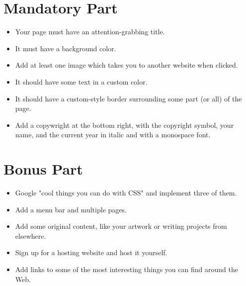 \documentclass{42-en}
\begin{document}

\chapter{Mandatory Part}

\begin{itemize}

\item Your page must have an attention-grabbing title.
\item It must have a background color.
\item Add at least one image which takes you to another website when clicked.
\item It should have some text in a custom color.
\item It should have a custom-style border surrounding some part (or all) of the page.
\item Add a copywright at the bottom right, with the copyright symbol, your name, and the current year in italic and with a monospace font.

\end{itemize}


\chapter{Bonus Part}

\begin{itemize}

\item Google "cool things you can do with CSS" and implement three of them.
\item Add a menu bar and multiple pages.
\item Add some original content, like your artwork or writing projects from elsewhere.
\item Sign up for a hosting website and host it yourself.
\item Add links to some of the most interesting things you can find around the Web.


\end{itemize}
\end{document}
